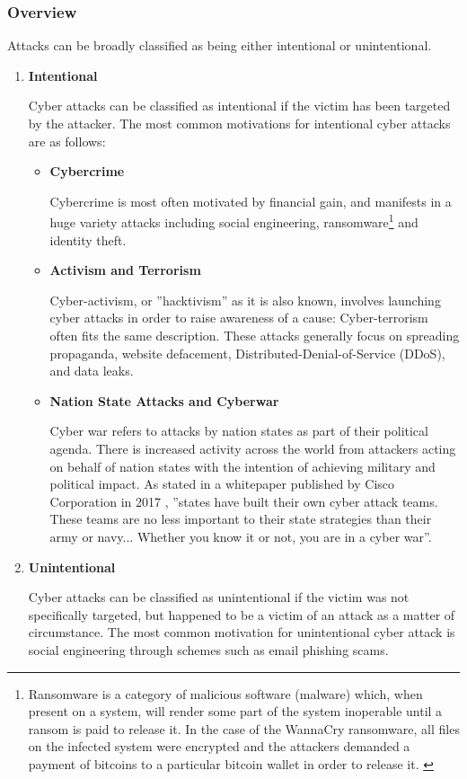 \subsubsection{Overview}
Attacks can be broadly classified as being either intentional or unintentional.


\begin{enumerate}
\item \textbf{Intentional}

Cyber attacks can be classified as intentional if the victim has been targeted by the attacker. The most common motivations for intentional cyber attacks are as follows:
\begin{itemize}

\item \textbf{Cybercrime}

Cybercrime is most often motivated by financial gain, and manifests in a huge variety attacks including social engineering, ransomware\footnote{Ransomware is a category of malicious software (malware) which, when present on a system, will render some part of the system inoperable until a ransom is paid to release it. In the case of the WannaCry ransomware, all files on the infected system were encrypted and the attackers demanded a payment of bitcoins to a particular bitcoin wallet in order to release it. \cite{KrebsWannaCry}} and identity theft.

\item \textbf{Activism and Terrorism}

Cyber-activism, or ''hacktivism'' as it is also known, involves launching cyber attacks in order to raise awareness of a cause: Cyber-terrorism often fits the same description. These attacks generally focus on spreading propaganda, website defacement, Distributed-Denial-of-Service (DDoS), and data leaks. 

\item \textbf{Nation State Attacks and Cyberwar}

Cyber war refers to attacks by nation states as part of their political agenda. There is increased activity across the world from attackers acting on behalf of nation states with the intention of achieving military and political impact. As stated in a whitepaper published by Cisco Corporation in 2017 \cite{CiscoAnatomyOfACyberAttack}, ''states have built their own cyber attack teams. These teams are no less important to their state strategies than their army or navy... Whether you know it or not, you are in a cyber war''. 



\end{itemize}
\item \textbf{Unintentional}

Cyber attacks can be classified as unintentional if the victim was not specifically targeted, but happened to be a victim of an attack as a matter of circumstance. The most common motivation for unintentional cyber attack is social engineering through schemes such as email phishing scams.
\end{enumerate}


